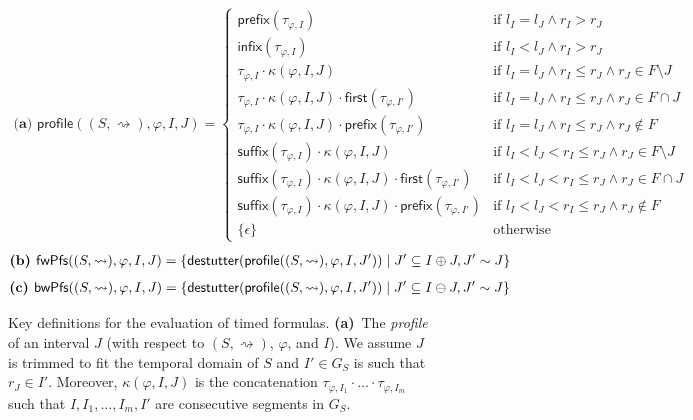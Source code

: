 \documentclass[iicol,lineno]{sn-jnl}
\renewcommand{\pfx}{\textsf{prefix}}
\newcommand{\first}{\textsf{first}}
\renewcommand{\sfx}{\textsf{suffix}}
\newcommand{\infx}{\textsf{infix}}
\newcommand{\hb}{\rightsquigarrow}
\newcommand{\destutter}{\mathsf{destutter}}
\newcommand{\?}{\text{?}}
\newcommand{\suchthat}{\;\ifnum\currentgrouptype=16 \middle\fi|\;}
\let\st\suchthat
\begin{document}
	\begin{figure}[!t]
		\begin{align*}
			\textbf{(a) }
			\mathsf{profile}((S,{\hb}), \varphi, I, J) =
			\begin{cases}
				\pfx(\tau_{\varphi,I}) & \text{if } l_I = l_J \land r_I > r_J \\
				\infx(\tau_{\varphi,I}) & \text{if } l_I < l_J \land r_I > r_J \\
				\tau_{\varphi,I} \cdot \kappa(\varphi, I, J) & \text{if } l_I = l_J \land r_I \leq r_J \land r_J \in F \setminus J \\
				\tau_{\varphi,I} \cdot \kappa(\varphi, I, J) \cdot \first(\tau_{\varphi,I'}) & \text{if } l_I = l_J \land r_I \leq r_J \land r_J \in F \cap J  \\		
				\tau_{\varphi,I} \cdot \kappa(\varphi, I, J) \cdot \pfx(\tau_{\varphi,I'}) & \text{if } l_I = l_J \land r_I \leq r_J \land r_J \notin F  \\
				\sfx(\tau_{\varphi,I}) \cdot \kappa(\varphi, I, J) & \text{if }  l_I < l_J < r_I \leq r_J \land r_J \in F \setminus J  \\
				\sfx(\tau_{\varphi,I}) \cdot \kappa(\varphi, I, J) \cdot \first(\tau_{\varphi,I'}) & \text{if } l_I < l_J < r_I \leq r_J \land r_J \in F \cap J \\
				\sfx(\tau_{\varphi,I}) \cdot \kappa(\varphi, I, J) \cdot \pfx(\tau_{\varphi,I'}) & \text{if } l_I < l_J < r_I \leq r_J \land r_J \notin F \\
				\{\epsilon\} & \text{otherwise}
			\end{cases}
		\end{align*}
		\begin{align*}
			\textbf{(b) }
			\mathsf{fwPfs}((S,{\hb}), \varphi, I, J) = \{\destutter(\mathsf{profile}((S,{\hb}), \varphi, I, J')) \st J' \subseteq I \oplus J, J' \sim J\}
		\end{align*}
		\begin{align*}
			\textbf{(c) }
			\mathsf{bwPfs}((S,{\hb}), \varphi, I, J) = \{\destutter(\mathsf{profile}((S,{\hb}), \varphi, I, J')) \st J' \subseteq I \ominus J, J' \sim J\}
		\end{align*}
		\caption{Key definitions for the evaluation of timed formulas.
			\textbf{(a)}~The \emph{profile} of an interval $J$ (with respect to $(S,{\hb})$, $\varphi$, and $I$).
			We assume $J$ is trimmed to fit the temporal domain of $S$ and $I' \in G_S$ is such that $r_J \in I'$.
			Moreover, $\kappa(\varphi, I, J)$ is the concatenation $\tau_{\varphi,I_1} \cdot \ldots \cdot \tau_{\varphi,I_m}$ such that $I, I_1, \ldots, I_m, I'$ are consecutive segments in $G_S$.
}
\end{figure}
\end{document}

